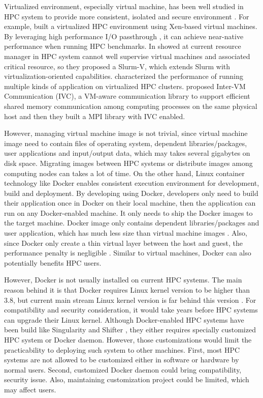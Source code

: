 Virtualized environment, especially virtual machine, has been well studied in HPC system to provide more consistent, isolated and secure environment \cite{vallee2008system, reuther2012hpc}. For example, \cite{huang2006case} built a virtualized HPC environment using Xen-based virtual machines. By leveraging high performance I/O passthrough \cite{liu2006high}, it can achieve near-native performance when running HPC benchmarks. In \cite{zhang2016slurm} showed at current resource manager in HPC system cannot well supervise virtual machines and associated critical resource, so they proposed a Slurm-V, which extends Slurm with virtualization-oriented capabilities. \cite{gugnani2016performance, tikotekar2008analysis} characterized the performance  of running multiple kinds of application on virtualized HPC clusters. \cite{} proposed Inter-VM Communication (IVC), a VM-aware communication library to support efficient shared memory communication among computing processes on the same physical host and then they built a MPI library with IVC enabled.

However, managing virtual machine image is not trivial, since virtual machine image need to contain files of operating system, dependent libraries/packages, user applications and input/output data, which may takes several gigabytes on disk space. Migrating images between HPC systems or distribute images among computing nodes can takes a lot of time. On the other hand, Linux container technology like Docker \cite{Docker} \cite{awscontainer} enables consistent execution environment for development, build and deployment. By developing using Docker, developers only need to build their application once in Docker on their local machine, then the application can run on any Docker-enabled machine. It only needs to ship the Docker images to the target machine. Docker image only contains dependent libraries/packages and user application, which has much less size than virtual machine images \cite{boettiger2015introduction}. Also, since Docker only create a thin virtual layer between the host and guest, the performance penalty is negligible \cite{merkel2014docker}. Similar to virtual machines, Docker can also potentially benefits HPC  users. 

However, Docker is not usually installed on current HPC systems. The main reason behind it is that Docker requires Linux kernel version to be higher than 3.8, but current main stream Linux kernel version is far behind this version \cite{harji2013our}. For compatibility and security consideration, it would take years before HPC systems can upgrade their Linux kernel. Although Docker-enabled HPC systems have been build like Singularity \cite{kurtzer_2016_60736} and Shifter \cite{jacobsen2015contain}, they either requires specially customized HPC system or Docker daemon. However, those customizations would limit the practicability to deploying such system to other machines. First, most HPC systems are not allowed to be customized either in software or hardware by normal users. Second, customized Docker daemon could bring compatibility, security issue. Also, maintaining customization project could be limited, which may affect users.

